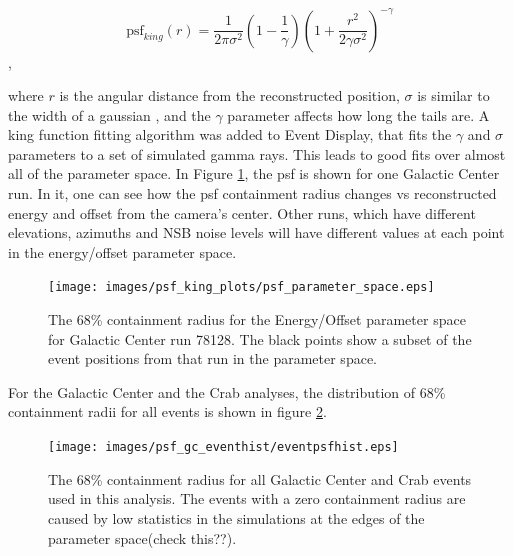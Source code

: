     \begin{equation} \label{eqn:king}
    \text{psf}_{king}(r) = \frac{1}{2 \pi \sigma^{2} } \left( 1 - \frac{1}{\gamma} \right) \left( 1 + \frac{ r^{2} }{ 2 \gamma \sigma^{2} } \right)^{-\gamma}
    \end{equation},

    where $r$ is the angular distance from the reconstructed position, $\sigma$ is similar to the width of a gaussian , and the $\gamma$ parameter affects how long the tails are.
    A king function fitting algorithm was added to Event Display, that fits the $\gamma$ and $\sigma$ parameters to a set of simulated gamma rays.
    This leads to good fits over almost all of the parameter space.
    In Figure \ref{fig:psf_paramspace}, the psf is shown for one Galactic Center run.
    In it, one can see how the psf containment radius changes vs reconstructed energy and offset from the camera's center.
    Other runs, which have different elevations, azimuths and NSB noise levels will have different values at each point in the energy/offset parameter space.

    \begin{figure}[ht]
      \centering
      \texttt{[image: images/psf\_king\_plots/psf\_parameter\_space.eps]}
      \caption[PSF Parameter Space]{
        The 68\% containment radius for the Energy/Offset parameter space for Galactic Center run 78128. 
        The black points show a subset of the event positions from that run in the parameter space.
      }
      \label{fig:psf_paramspace}
    \end{figure}

    For the Galactic Center and the Crab analyses, the distribution of 68\% containment radii for all events is shown in figure \ref{fig:gc_psf_hist}.

    \begin{figure}[ht]
      \centering
      \texttt{[image: images/psf\_gc\_eventhist/eventpsfhist.eps]}
      \caption[Crab and Galactic Center Event PSFs]{
        The 68\% containment radius for all Galactic Center and Crab events used in this analysis.
        The events with a zero containment radius are caused by low statistics in the simulations at the edges of the parameter space(check this??).
      }
      \label{fig:gc_psf_hist}
    \end{figure}

